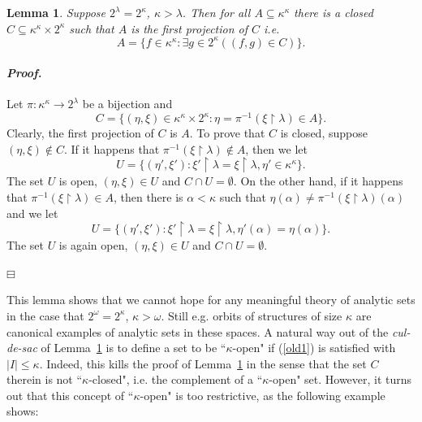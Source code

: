 \documentclass[12pt,a4paper]{amsart}
\newtheorem{lemma}[thm]{Lemma}
\theoremstyle{definition}
\theoremstyle{remark}
\renewcommand{\restriction}{\mathbin\upharpoonright}
\newenvironment{cproof}{\paragraph{\emph{Proof.\,}}}{\hfill{$\boxminus$}\par\vspace{2mm}}
\def\borelstar{Borel\nobreak\hspace{1pt}$^*$}
\begin{document}
\begin{lemma}\label{dead-end}
    Suppose $2^\lambda=2^\kappa$, $\kappa>\lambda$. Then for all $A\subseteq \kappa^\kappa$ there is a closed $C\subseteq \kappa^\kappa\times 2^\kappa$ such that $A$ is the first projection  of $C$ i.e. $$A=\{f\in \kappa^\kappa:\exists g\in 2^\kappa((f,g)\in C)\}.$$ 
\end{lemma}

\begin{cproof}
Let $\pi:\kappa^\kappa\to 2^{\lambda}$ be a bijection and
$$C=\{(\eta,\xi)\in \kappa^\kappa\times 2^\kappa: \eta=\pi^{-1}(\xi\restriction\lambda)\in A\}.$$Clearly, the first projection of $C$ is $A$. To prove that $C$ is closed, suppose $(\eta,\xi)\notin C$. If it happens that $\pi^{-1}(\xi\restriction\lambda)\notin A$, then we let
$$U=\{(\eta',\xi'):\xi'\restriction\lambda=\xi\restriction\lambda, \eta'\in \kappa^\kappa\}.$$ The set $U$ is open, $(\eta,\xi)\in U$ and $C\cap U=\emptyset$. On the other hand, if it happens that  $\pi^{-1}(\xi\restriction\lambda)\in A$, then there is $\alpha<\kappa$ such that $\eta(\alpha)\ne\pi^{-1}(\xi\restriction\lambda)(\alpha)$ and we let
$$U=\{(\eta',\xi'):\xi'\restriction\lambda=\xi\restriction\lambda, \eta'(\alpha)=\eta(\alpha)\}.$$ The set $U$ is again open, $(\eta,\xi)\in U$ and $C\cap U=\emptyset$. 

\end{cproof}

This lemma shows that we cannot hope for any meaningful theory of analytic sets in the case that $2^\omega=2^\kappa$, $\kappa>\omega$. Still e.g. orbits of  structures of size $\kappa$ are canonical examples of analytic sets in these spaces. 
%
A natural way out of the \emph{cul-de-sac} of Lemma~\ref{dead-end} is to define a set to be ``$\kappa$-open" if (\ref{old1}) is satisfied with $|I|\le\kappa$. Indeed, this kills the proof of Lemma~\ref{dead-end} in the sense that the set $C$ therein is not ``$\kappa$-closed", i.e. the complement of a ``$\kappa$-open" set. However, it turns out that this concept of ``$\kappa$-open" is too restrictive, as the following example shows:
\end{document}
